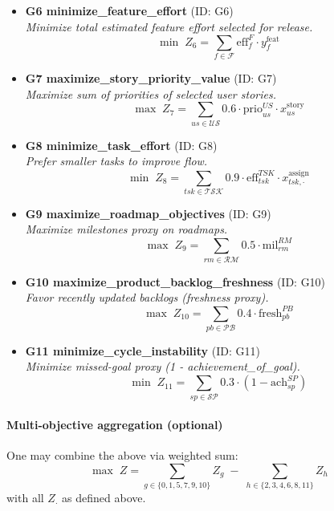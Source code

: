 \documentclass[11pt,a4paper]{article}
\begin{document}
\begin{itemize}[leftmargin=2em]
  \item \textbf{G6 minimize\_feature\_effort} \; (ID: G6)\\
  \emph{Minimize total estimated feature effort selected for release.}\\
  \[
    \min \; Z_{6} = \sum_{f \in \mathcal{F}} \text{eff}^{F}_f \cdot y^{\text{feat}}_{f}
  \]

  \item \textbf{G7 maximize\_story\_priority\_value} \; (ID: G7)\\
  \emph{Maximize sum of priorities of selected user stories.}\\
  \[
    \max \; Z_{7} = \sum_{us \in \mathcal{US}} 0.6 \cdot \text{prio}^{US}_{us} \cdot x^{\text{story}}_{us}
  \]

  \item \textbf{G8 minimize\_task\_effort} \; (ID: G8)\\
  \emph{Prefer smaller tasks to improve flow.}\\
  \[
    \min \; Z_{8} = \sum_{tsk \in \mathcal{TSK}} 0.9 \cdot \text{eff}^{TSK}_{tsk} \cdot x^{\text{assign}}_{tsk,\cdot}
  \]

  \item \textbf{G9 maximize\_roadmap\_objectives} \; (ID: G9)\\
  \emph{Maximize milestones proxy on roadmaps.}\\
  \[
    \max \; Z_{9} = \sum_{rm \in \mathcal{RM}} 0.5 \cdot \text{mil}^{RM}_{rm}
  \]

  \item \textbf{G10 maximize\_product\_backlog\_freshness} \; (ID: G10)\\
  \emph{Favor recently updated backlogs (freshness proxy).}\\
  \[
    \max \; Z_{10} = \sum_{pb \in \mathcal{PB}} 0.4 \cdot \text{fresh}^{PB}_{pb}
  \]

  \item \textbf{G11 minimize\_cycle\_instability} \; (ID: G11)\\
  \emph{Minimize missed-goal proxy (1 - achievement\_of\_goal).}\\
  \[
    \min \; Z_{11} = \sum_{sp \in \mathcal{SP}} 0.3 \cdot \left(1 - \text{ach}^{SP}_{sp}\right)
  \]
\end{itemize}

\paragraph{Multi-objective aggregation (optional)}
One may combine the above via weighted sum:
\[
  \max\; Z = \sum_{g \in \{0,1,5,7,9,10\}} Z_g \;-\; \sum_{h \in \{2,3,4,6,8,11\}} Z_h
\]
with all $Z_\cdot$ as defined above.
\end{document}
